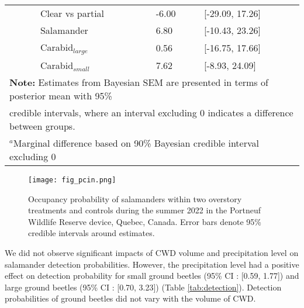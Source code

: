 \begin{table}[ht]
\begin{tabular}{lllll}
                          && Clear vs partial  & -6.00 & [-29.09, 17.26] \\  
                          && Salamander        & \hspace{1mm}6.80 & [-10.43, 23.26] \\ 
                          && Carabid$_{large}$      & \hspace{1mm}0.56 & [-16.75, 17.66] \\ 
                          && Carabid$_{small}$      & \hspace{1mm}7.62 & [-8.93, 24.09] \\ 
      \hline
      \multicolumn{5}{l}{\textbf{Note:} Estimates from Bayesian SEM are presented in terms of posterior mean with 95\%} \\
      \multicolumn{5}{l}{credible intervals, where an interval excluding 0 indicates a difference between groups.} \\
      \multicolumn{5}{l}{$^{a}$Marginal difference based on 90\% Bayesian credible interval excluding 0}
  \end{tabular}
\end{table}


\clearpage

\begin{figure}[ht]
  \centering
  \texttt{[image: fig\_pcin.png]}
  \caption[Occupancy probability of salamanders under overstory treatments]
  {Occupancy probability of salamanders within two overstory treatments and controls during the summer 2022 in the Portneuf Wildlife Reserve device, Quebec, Canada. 
  Error bars denote 95\% credible intervals around estimates.}
  \label{fig:pcin}
\end{figure}

\vspace{10pt}

We did not observe significant impacts of CWD volume and precipitation level on salamander detection probabilities. 
However, the precipitation level had a positive effect on detection probability for small ground beetles (95\% CI : [0.59, 1.77]) and large ground beetles (95\% CI : [0.70, 3.23]) (Table \ref{tab:detection}). 
Detection probabilities of ground beetles did not vary with the volume of CWD.

